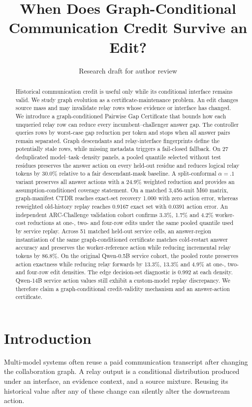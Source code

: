 \documentclass[11pt]{article}
\title{When Does Graph-Conditional Communication Credit Survive an Edit?}
\author{Research draft for author review}
\begin{document}
\maketitle

\begin{abstract}
Historical communication credit is useful only while its conditional interface remains valid. We study graph evolution as a certificate-maintenance problem. An edit changes source mass and may invalidate relay rows whose evidence or interface has changed. We introduce a graph-conditioned Pairwise Gap Certificate that bounds how each unqueried relay row can reduce every incumbent--challenger answer gap. The controller queries rows by worst-case gap reduction per token and stops when all answer pairs remain separated. Graph descendants and relay-interface fingerprints define the potentially stale rows, while missing metadata triggers a fail-closed fallback. On 27 deduplicated model--task--density panels, a pooled quantile selected without test residues preserves the answer action on every held-out residue and reduces logical relay tokens by 30.0\% relative to a fair descendant-mask baseline. A split-conformal $\alpha=.1$ variant preserves all answer actions with a 24.9\% weighted reduction and provides an assumption-conditioned coverage statement. On a matched 3,456-unit M60 matrix, graph-manifest CTDR reaches exact-set recovery 1.000 with zero action error, whereas reweighted old-history replay reaches 0.9167 exact set with 0.0391 action error. An independent ARC-Challenge validation cohort confirms 3.3\%, 1.7\% and 4.2\% worker-cost reductions at one-, two- and four-row edits under the same pooled quantile used by service replay. Across 51 matched held-out service cells, an answer-region instantiation of the same graph-conditioned certificate matches cold-restart answer accuracy and preserves the worker-reference action while reducing incremental relay tokens by 86.8\%. On the original Qwen-0.5B service cohort, the pooled route preserves action exactness while reducing relay forwards by 13.3\%, 13.3\% and 4.9\% at one-, two- and four-row edit densities. The edge decision-set diagnostic is 0.992 at each density. Qwen-14B service action values still exhibit a custom-model replay discrepancy. We therefore claim a graph-conditional credit-validity mechanism and an answer-action certificate.
\end{abstract}

\section{Introduction}
Multi-model systems often reuse a paid communication transcript after changing the collaboration graph. A relay output is a conditional distribution produced under an interface, an evidence context, and a source mixture. Reusing its historical value after any of these change can silently alter the downstream action.
\end{document}
